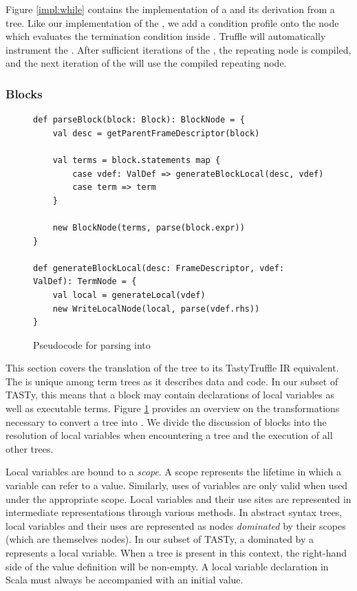 Figure \ref{impl:while} contains the implementation of a  and its derivation from a  tree.
Like our implementation of the , we add a condition profile onto the node which evaluates the termination condition inside .
Truffle will automatically instrument the .
After sufficient iterations of the , the repeating node is compiled, and the next iteration of the  will use the compiled repeating node.

\subsubsection*{Blocks}

\begin{figure}[!htb]
\begin{verbatim}
def parseBlock(block: Block): BlockNode = {
	val desc = getParentFrameDescriptor(block)
		
	val terms = block.statements map {
		case vdef: ValDef => generateBlockLocal(desc, vdef)
		case term => term 
	}
		
	new BlockNode(terms, parse(block.expr))
}
	
def generateBlockLocal(desc: FrameDescriptor, vdef: ValDef): TermNode = {
	val local = generateLocal(vdef)
	new WriteLocalNode(local, parse(vdef.rhs))
}	
\end{verbatim}
\caption{Pseudocode for parsing  into }
\label{impl:parse-block}
\end{figure}

This section covers the translation of the  tree to its TastyTruffle IR equivalent.
The  is unique among term trees as it describes data and code.
In our subset of TASTy, this means that a block may contain declarations of local variables as well as executable terms.
Figure \ref{impl:parse-block} provides an overview on the transformations necessary to convert a  tree into .
We divide the discussion of blocks into the resolution of local variables when encountering a  tree and the execution of all other trees.

Local variables are bound to a \textit{scope}. 
A scope represents the lifetime in which a variable can refer to a value. 
Similarly, uses of variables are only valid when used under the appropriate scope. 
Local variables and their use sites are represented in intermediate representations through various methods. 
In abstract syntax trees, local variables and their uses are represented as nodes \textit{dominated} by their scopes (which are themselves nodes). 
In our subset of TASTy, a  dominated by a  represents a local variable.
When a  tree is present in this context, the right-hand side of the value definition will be non-empty.
A local variable declaration in Scala must always be accompanied with an initial value.

